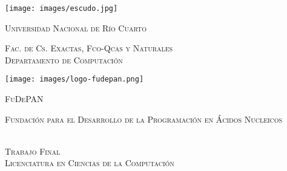 \documentclass[12pt,spanish,a4paper]{report}
\begin{document}

	\begin{titlepage} 
		\begin{center}
		
            \begin{minipage}{0.45\textwidth}
                \begin{center}
                    \texttt{[image: images/escudo.jpg]}\\
                    \begin{footnotesize}
                        \textsc{Universidad Nacional de Río Cuarto} \\
                    \end{footnotesize}
                    \vfill
                    \begin{scriptsize}
                        \textsc{Fac. de Cs. Exactas, Fco-Qcas y Naturales} \\
                        \textsc{Departamento de Computación} \\[1cm]    
                    \end{scriptsize}
                \end{center}
            \end{minipage}
            \begin{minipage}{0.45\textwidth}
                \begin{center}
                    \texttt{[image: images/logo-fudepan.png]}\\
                    \vfill
                    \begin{footnotesize}
                        \textsc{FuDePAN} \\
                    \end{footnotesize}
                    \begin{scriptsize}
                        \textsc{Fundación para el Desarrollo de la Programación en Ácidos Nucleicos} \\[1cm]    
                    \end{scriptsize}
                \end{center}
            \end{minipage}

			\textsc{\\[2cm] \large Trabajo Final}\\[0.2cm]
			\textsc{Licenciatura en Ciencias de la Computación}\\[0.2cm]


\end{center}
\end{titlepage}
\end{document}

